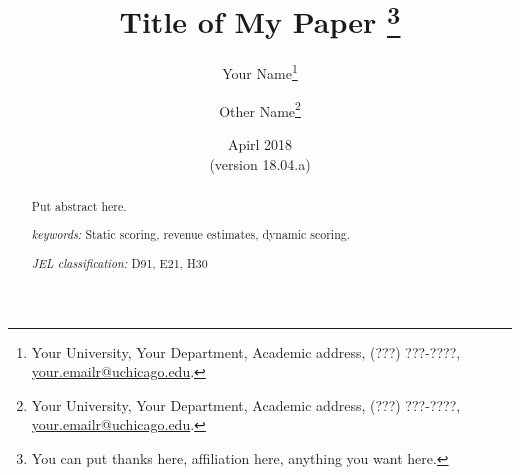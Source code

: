 \documentclass[letterpaper,12pt]{article}
\theoremstyle{definition}
\begin{document}
\begin{titlepage}
\title{Title of My Paper \thanks{You can put thanks here, affiliation here, anything you want here.}
       }
       \author{
  Your Name\footnote{Your University, Your Department, Academic address, (???) ???-????, \href{mailto:your.emailr@uchicago.edu}{your.emailr@uchicago.edu}.} \\[-2pt]
  \and
  Other Name\footnote{Your University, Your Department, Academic address, (???) ???-????, \href{mailto:your.emailr@uchicago.edu}{your.emailr@uchicago.edu}.}}
\date{Apirl 2018 \\
  \scriptsize{(version 18.04.a)}}
\maketitle
\vspace{-9mm}
\begin{abstract}
\small{Put abstract here.
\vspace{3mm}

\noindent\textit{keywords:}\: Static scoring, revenue estimates, dynamic scoring.

\vspace{3mm}

\noindent\textit{JEL classification:} D91, E21, H30
}

\end{abstract}
\thispagestyle{empty}
\end{titlepage}
\end{document}
